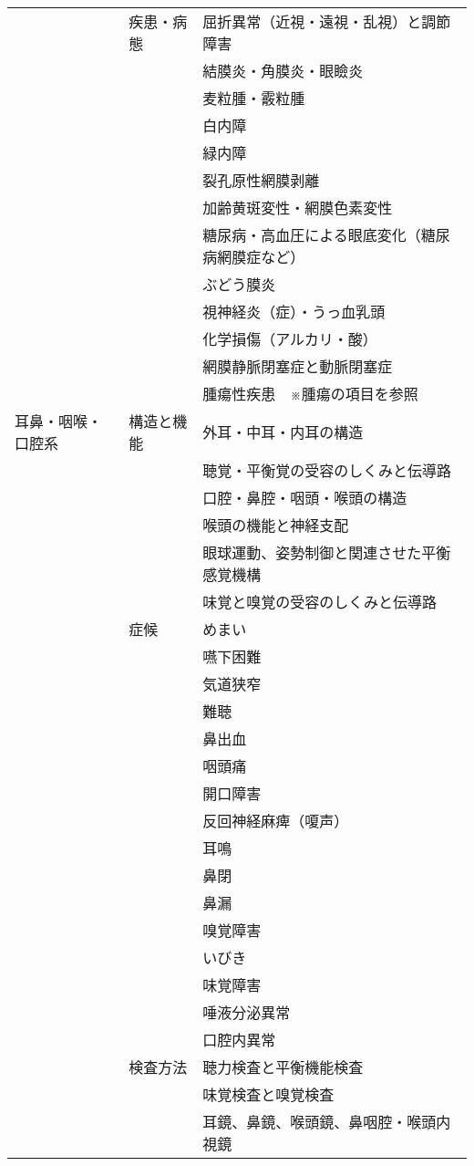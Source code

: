 \documentclass[
]{ltjsarticle}
\begin{document}
\begin{xltabular}{\linewidth}{XXX}
 & 疾患・病態 & 屈折異常（近視・遠視・乱視）と調節障害 \\
 &  & 結膜炎・角膜炎・眼瞼炎 \\
 &  & 麦粒腫・霰粒腫 \\
 &  & 白内障 \\
 &  & 緑内障 \\
 &  & 裂孔原性網膜剥離 \\
 &  & 加齢黄斑変性・網膜色素変性 \\
 &  & 糖尿病・高血圧による眼底変化（糖尿病網膜症など） \\
 &  & ぶどう膜炎 \\
 &  & 視神経炎（症）・うっ血乳頭 \\
 &  & 化学損傷（アルカリ・酸） \\
 &  & 網膜静脈閉塞症と動脈閉塞症 \\
 &  & 腫瘍性疾患　※腫瘍の項目を参照 \\
耳鼻・咽喉・口腔系 & 構造と機能 & 外耳・中耳・内耳の構造 \\
 &  & 聴覚・平衡覚の受容のしくみと伝導路 \\
 &  & 口腔・鼻腔・咽頭・喉頭の構造 \\
 &  & 喉頭の機能と神経支配 \\
 &  & 眼球運動、姿勢制御と関連させた平衡感覚機構 \\
 &  & 味覚と嗅覚の受容のしくみと伝導路 \\
 & 症候 & めまい \\
 &  & 嚥下困難 \\
 &  & 気道狭窄 \\
 &  & 難聴 \\
 &  & 鼻出血 \\
 &  & 咽頭痛 \\
 &  & 開口障害 \\
 &  & 反回神経麻痺（嗄声） \\
 &  & 耳鳴 \\
 &  & 鼻閉 \\
 &  & 鼻漏 \\
 &  & 嗅覚障害 \\
 &  & いびき \\
 &  & 味覚障害 \\
 &  & 唾液分泌異常 \\
 &  & 口腔内異常 \\
 & 検査方法 & 聴力検査と平衡機能検査 \\
 &  & 味覚検査と嗅覚検査 \\
 &  & 耳鏡、鼻鏡、喉頭鏡、鼻咽腔・喉頭内視鏡 \\

\end{xltabular}
\end{document}
